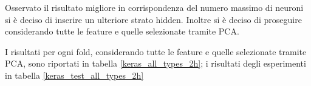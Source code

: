 \documentclass[12pt]{report}
\begin{document}
\begin{table}[H]
\end{table}


Osservato il risultato migliore in corrispondenza del numero massimo di neuroni si è deciso di inserire un ulteriore strato hidden.
Inoltre si è deciso di proseguire considerando tutte le feature e quelle selezionate tramite PCA.

I risultati per ogni fold, considerando tutte le feature e quelle selezionate tramite PCA, sono riportati in tabella \ref{keras_all_types_2h}; i risultati degli esperimenti in tabella \ref{keras_test_all_types_2h}

\par\null\par
\end{document}
